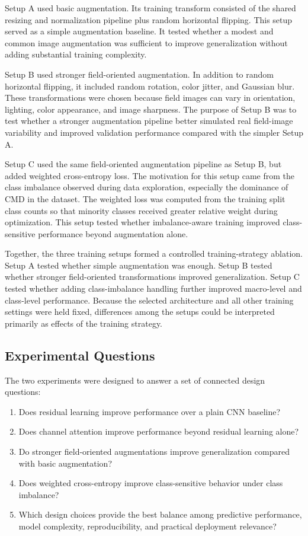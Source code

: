 \documentclass[11pt]{article}
\begin{document}
Setup A used basic augmentation. Its training transform consisted of the shared resizing and normalization pipeline plus random horizontal flipping. This setup served as a simple augmentation baseline. It tested whether a modest and common image augmentation was sufficient to improve generalization without adding substantial training complexity.

Setup B used stronger field-oriented augmentation. In addition to random horizontal flipping, it included random rotation, color jitter, and Gaussian blur. These transformations were chosen because field images can vary in orientation, lighting, color appearance, and image sharpness. The purpose of Setup B was to test whether a stronger augmentation pipeline better simulated real field-image variability and improved validation performance compared with the simpler Setup A.

Setup C used the same field-oriented augmentation pipeline as Setup B, but added weighted cross-entropy loss. The motivation for this setup came from the class imbalance observed during data exploration, especially the dominance of CMD in the dataset. The weighted loss was computed from the training split class counts so that minority classes received greater relative weight during optimization. This setup tested whether imbalance-aware training improved class-sensitive performance beyond augmentation alone.

Together, the three training setups formed a controlled training-strategy ablation. Setup A tested whether simple augmentation was enough. Setup B tested whether stronger field-oriented transformations improved generalization. Setup C tested whether adding class-imbalance handling further improved macro-level and class-level performance. Because the selected architecture and all other training settings were held fixed, differences among the setups could be interpreted primarily as effects of the training strategy.

\subsection{Experimental Questions}

The two experiments were designed to answer a set of connected design questions:

\begin{enumerate}
    \item Does residual learning improve performance over a plain CNN baseline?
    \item Does channel attention improve performance beyond residual learning alone?
    \item Do stronger field-oriented augmentations improve generalization compared with basic augmentation?
    \item Does weighted cross-entropy improve class-sensitive behavior under class imbalance?
    \item Which design choices provide the best balance among predictive performance, model complexity, reproducibility, and practical deployment relevance?
\end{enumerate}
\end{document}
